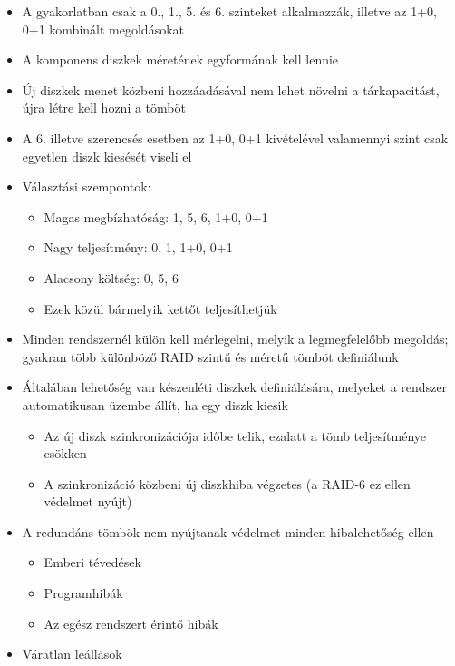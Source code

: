 \documentclass[tikz,12pt,margin=0px]{article}
\begin{document}
    \begin{itemize}[topsep=8pt,itemsep=4pt,partopsep=4pt, parsep=4pt]
        \item A gyakorlatban csak a 0., 1., 5. és 6. szinteket alkalmazzák, illetve az 1+0, 0+1 kombinált megoldásokat
        \item A komponens diszkek méretének egyformának kell lennie
        \item Új diszkek menet közbeni hozzáadásával nem lehet növelni a tárkapacitást, újra létre kell hozni a tömböt
        \item A 6. illetve szerencsés esetben az 1+0, 0+1 kivételével valamennyi szint csak egyetlen diszk kiesését viseli el
        \item Választási szempontok:
        \begin{itemize}
            \item Magas megbízhatóság: 1, 5, 6, 1+0, 0+1
            \item Nagy teljesítmény: 0, 1, 1+0, 0+1
            \item Alacsony költség: 0, 5, 6
            \item Ezek közül bármelyik kettőt teljesíthetjük
        \end{itemize}
        \item Minden rendszernél külön kell mérlegelni, melyik a legmegfelelőbb megoldás; gyakran több különböző RAID szintű és méretű tömböt definiálunk
        \item Általában lehetőség van készenléti diszkek definiálására, melyeket a rendszer automatikusan üzembe állít, ha egy diszk kiesik
        \begin{itemize}
            \item Az új diszk szinkronizációja időbe telik, ezalatt a tömb teljesítménye csökken
            \item A szinkronizáció közbeni új diszkhiba végzetes (a RAID-6 ez ellen védelmet nyújt)
        \end{itemize}
        \item A redundáns tömbök nem nyújtanak védelmet minden hibalehetőség ellen
        \begin{itemize}
          \item Emberi tévedések
          \item Programhibák
          \item Az egész rendszert érintő hibák
        \end{itemize}
        \item Váratlan leállások

\end{itemize}
\end{document}
